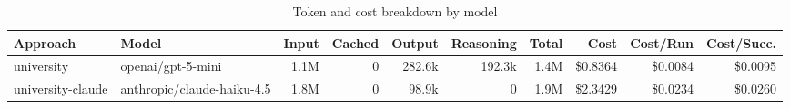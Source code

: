 \begin{table}[htbp]
\centering
\caption{Token and cost breakdown by model}
\label{tab:token-breakdown}
\begin{tabular}{llrrrrrrrr}
\toprule
Approach & Model & Input & Cached & Output & Reasoning & Total & Cost & Cost/Run & Cost/Succ. \\
\midrule
university & openai/gpt-5-mini & 1.1M & 0 & 282.6k & 192.3k & 1.4M & \$0.8364 & \$0.0084 & \$0.0095 \\
university-claude & anthropic/claude-haiku-4.5 & 1.8M & 0 & 98.9k & 0 & 1.9M & \$2.3429 & \$0.0234 & \$0.0260 \\
\bottomrule
\end{tabular}
\end{table}
